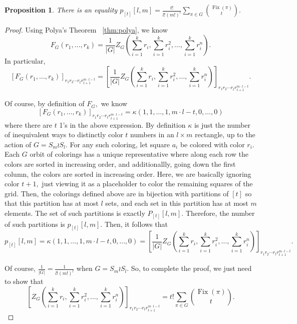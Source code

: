 \documentclass{amsart}
\newtheorem{prop}[thm]{Proposition}
\theoremstyle{remark}
\def\Fix{\operatorname{Fix}}
\begin{document}
\begin{prop}
\label{prop:box_partition_by_size}
There is an equality $p_{[t]}[l,m] = \frac {t!}{l!(m!)^l}\sum_{\pi \in G} \binom {\Fix(\pi)} t.$
\end{prop}
\begin{proof}
Using Polya's Theorem ~\ref{thm:polya}, we know 
$$F_G(r_1,\ldots, r_k) = \frac 1 {|G|}Z_G(\sum_{i=1}^k r_i,\sum_{i=1}^k r_i^2,\ldots, \sum_{i=1}^k r_i^n).$$ In particular, 
$$[F_G(r_1,\ldots, r_k)]_{r_1 r_2 \cdots r_t r_{t+1}^{m\cdot l-t}} = [\frac 1 {|G|}Z_G(\sum_{i=1}^k r_i,\sum_{i=1}^k r_i^2,\ldots, \sum_{i=1}^k r_i^n)]_{r_1 r_2 \cdots r_t r_{t+1}^{m\cdot l - t}}.$$

Of course, by definition of $F_G,$ we know 
$$[F_G(r_1,\ldots, r_k)]_{r_1 r_2 \cdots r_t r_{t+1}^{m\cdot l-t}} = \kappa(1,1,\ldots, 1,m \cdot l - t,0,\ldots, 0)$$
where there are $t$ 1's in the above expression. By definition $\kappa$ is just the number of inequivalent ways to distinctly color $t$ numbers in an $l \times m$ rectangle, up to the action of $G = S_m \wr S_l.$ For any such coloring, let square $a_i$ be colored with color $r_i.$ Each $G$ orbit of colorings has a unique representative where along each row the colors are sorted in increasing order, and additionallly, going down the first column, the colors are sorted in increasing order. Here, we are basically ignoring color $t+1,$ just viewing it as a placeholder to color the remaining squares of the grid. Then, the colorings defined above are in bijection with partitions of $[t]$ so that this partition has at most $l$ sets, and each set in this partition has at most $m$ elements. The set of such partitions is exactly  $P_{[t]}[l,m].$ Therefore, the number of such partitions is $p_{[t]}[l,m].$ Then, it follows that
$$p_{[t]}[l,m] = \kappa(1,1,\ldots, 1,m \cdot l - t,0,\ldots, 0) = [\frac 1 {|G|}Z_G(\sum_{i=1}^k r_i,\sum_{i=1}^k r_i^2,\ldots, \sum_{i=1}^k r_i^n)]_{r_1 r_2 \cdots r_t r_{t+1}^{m\cdot l - t}}.$$

Of course, $\frac 1 {|G|} = \frac 1 {l!(m!)^l}$ when $G = S_m \wr S_l.$ So, to complete the proof, we just need to show that 
$$[Z_G(\sum_{i=1}^k r_i,\sum_{i=1}^k r_i^2,\ldots, \sum_{i=1}^k r_i^n)]_{r_1 r_2 \cdots r_t r_{t+1}^{m\cdot l - t}} =  t!\sum_{\pi \in G} \binom {\Fix(\pi)} t.$$


\end{proof}
\end{document}
